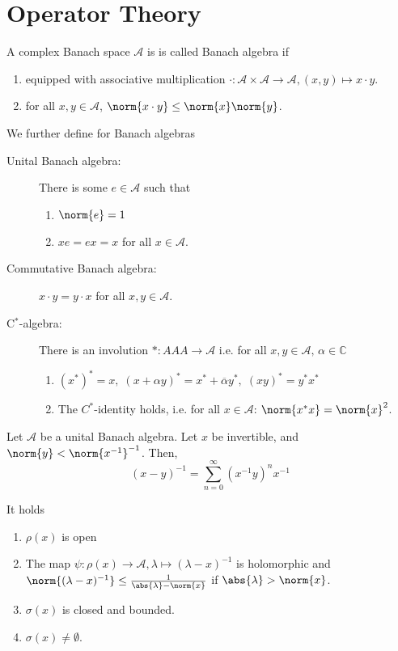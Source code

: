 \section{Operator Theory}


\begin{defn}
    A complex Banach space $\mathcal{A}$ is is called Banach algebra if 
    \begin{enumerate}
      \item equipped with associative multiplication $\cdot: \mathcal{A} \times \mathcal{A} \to \mathcal{A}, (x,y)\mapsto x\cdot y$.
      \item for all $x,y \in \mathcal{A}$, $\norm{x\cdot y} \leq \norm{x}\norm{y}$.
    \end{enumerate}
We further define for Banach algebras
\begin{description}
  \item [Unital Banach algebra:] There is some $e\in \mathcal{A}$ such that 
    \begin{enumerate}
      \item $\norm{e}=1$
      \item $xe=ex=x$ for all $x \in \mathcal{A}$.
    \end{enumerate} 
  \item [Commutative Banach algebra:] $x\cdot y = y \cdot x$ for all $x,y\in \mathcal{A}$.
  \item [C$^*$-algebra:] There is an involution $*:AAA   \to \mathcal{A}$ i.e. for all $x,y\in \mathcal{A},\, \alpha \in \mathbb{C}$
    \begin{enumerate}
      \item \((x^*)^* = x,\; (x+\alpha y)^*= x^* + \overline{\alpha}y^*, \; (xy)^*=y^*x^*\)
      \item The $C^*$-identity holds, i.e. for all $x\in \mathcal{A}$: $\norm{x^*x} = \norm{x}^2$.
    \end{enumerate} 
\end{description}
\end{defn}


\begin{thm}
  Let $\mathcal{A}$ be a unital Banach algebra. Let $x$ be invertible, and $\norm{y}< \norm{x^{-1}}^{-1}$. Then,
  \[(x-y)^{-1} = \sum_{n=0}^\infty (x^{-1}y)^n x^{-1}\]
\end{thm}


\begin{thm}
    It holds 
    \begin{enumerate}
        \item $\rho(x)$ is open
        \item The map $\psi: \rho(x) \to \mathcal{A}, \lambda \mapsto (\lambda-x)^{-1}$ is holomorphic and $\norm{(\lambda-x)^{-1}} \leq \frac{1}{\abs{\lambda}- \norm{x}}$ if $\abs{\lambda}> \norm{x}$.
        \item $\sigma(x)$ is closed and bounded.
        \item $\sigma(x)\neq \emptyset$.
    \end{enumerate}
\end{thm}


